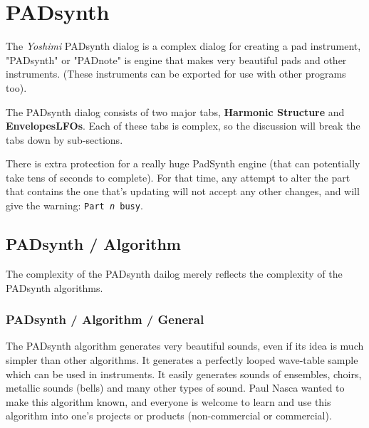 %
%
%

\section{PADsynth}
\label{sec:padsynth}

   The \textsl{Yoshimi} PADsynth dialog is a complex dialog for creating a
   pad instrument,  "PADsynth" or "PADnote" is engine that makes very
   beautiful pads and other instruments. (These instruments can be exported
   for use with other programs too).

   The PADsynth dialog consists of two major tabs,
   \textbf{Harmonic Structure} and \textbf{EnvelopesLFOs}.
   Each of these tabs is complex, so the discussion
   will break the tabs down by sub-sections.

   There is extra protection for a really huge PadSynth engine
   (that can potentially take tens of seconds to complete).
   For that time, any attempt to alter the part that contains the one
   that's updating will not accept any other changes,
   and will give the warning: \texttt{Part \textsl{n} busy}.

\subsection{PADsynth / Algorithm}
\label{subsec:padsynth_algorithm}

   The complexity of the PADsynth dailog merely reflects the complexity of the
   PADsynth algorithms.

\subsubsection{PADsynth / Algorithm / General}
\label{subsubsec:padsynth_algorithm_general}

   The PADsynth algorithm generates very beautiful sounds, even if its idea is
   much simpler than other algorithms. It generates a perfectly looped
   wave-table sample which can be used in instruments. It easily generates
   sounds of ensembles, choirs, metallic sounds (bells) and many other types of
   sound.  Paul Nasca wanted to make this algorithm known, and everyone is
   welcome to learn and use this algorithm into one's projects or products
   (non-commercial or commercial).

